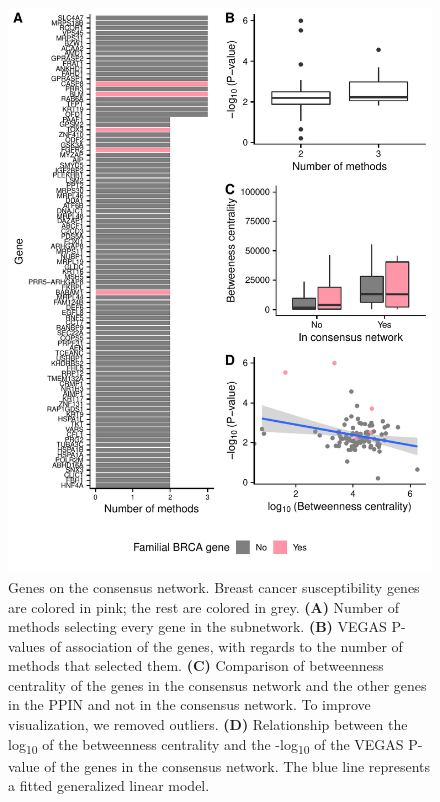 \documentclass[twocolumn, 10pt]{article}
\begin{document}
\begin{figure}[htbp]
\centering
\includegraphics[width=\textwidth,height=\textheight,keepaspectratio]{./figures/sfigure_8.pdf}
\caption{\label{sfig:consensus_stats}
Genes on the consensus network. Breast cancer susceptibility genes are colored in pink; the rest are colored in grey. \textbf{(A)} Number of methods selecting every gene in the subnetwork. \textbf{(B)} VEGAS P-values of association of the genes, with regards to the number of methods that selected them. \textbf{(C)} Comparison of betweenness centrality of the genes in the consensus network and the other genes in the PPIN and not in the consensus network. To improve visualization, we removed outliers. \textbf{(D)} Relationship between the log\textsubscript{10} of the betweenness centrality and the -log\textsubscript{10} of the VEGAS P-value of the genes in the consensus network. The blue line represents a fitted generalized linear model.}
\end{figure}
\end{document}
